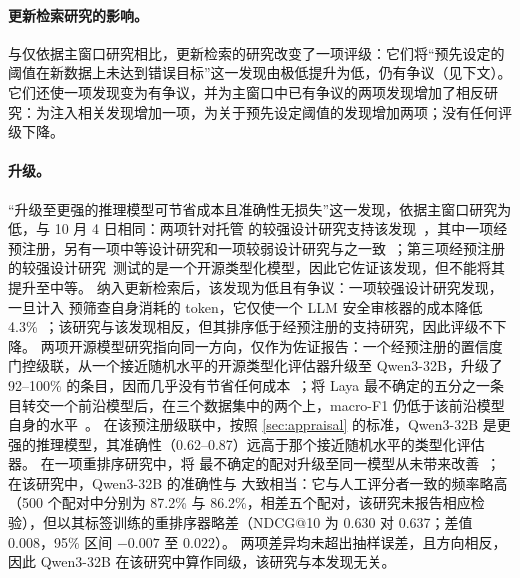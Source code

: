 \paragraph{更新检索研究的影响。}
与仅依据主窗口研究相比，更新检索的研究改变了一项评级：它们将“预先设定的阈值在新数据上未达到错误目标”这一发现由极低提升为低，仍有争议（见下文）。它们还使一项发现变为有争议，并为主窗口中已有争议的两项发现增加了相反研究：为注入相关发现增加一项，为关于预先设定阈值的发现增加两项；没有任何评级下降。

\paragraph{升级。}
“升级至更强的推理模型可节省成本且准确性无损失”这一发现，依据主窗口研究为低，与 10 月 4 日相同：两项针对托管 \jev{} 的较强设计研究支持该发现~\cite{arx26550,arx24574}，其中一项经预注册，另有一项中等设计研究和一项较弱设计研究与之一致~\cite{arx26532,arx02046}；第三项经预注册的较强设计研究~\cite{zen22922769}\zmark{}测试的是一个开源类型化模型，因此它佐证该发现，但不能将其提升至中等。
纳入更新检索后，该发现为低且有争议：一项较强设计研究发现，一旦计入 \jev{} 预筛查自身消耗的 token，它仅使一个 LLM 安全审核器的成本降低 4.3\%~\cite{arx02267}；该研究与该发现相反，但其排序低于经预注册的支持研究，因此评级不下降。
两项开源模型研究指向同一方向，仅作为佐证报告：一个经预注册的置信度门控级联，从一个接近随机水平的开源类型化评估器升级至 Qwen3-32B，升级了 92--100\% 的条目，因而几乎没有节省任何成本~\cite{arx07177}；将 Laya 最不确定的五分之一条目转交一个前沿模型后，在三个数据集中的两个上，macro-F1 仍低于该前沿模型自身的水平~\cite{arx03324}。
在该预注册级联中，按照 \cref{sec:appraisal} 的标准，Qwen3-32B 是更强的推理模型，其准确性（0.62--0.87）远高于那个接近随机水平的类型化评估器。
在一项重排序研究中，将 \jev{} 最不确定的配对升级至同一模型从未带来改善~\cite{arx09188}；在该研究中，Qwen3-32B 的准确性与 \jev{} 大致相当：它与人工评分者一致的频率略高（500 个配对中分别为 87.2\% 与 86.2\%，相差五个配对，该研究未报告相应检验），但以其标签训练的重排序器略差（NDCG@10 为 0.630 对 0.637；差值 0.008，95\% 区间 $-0.007$ 至 $0.022$）。
两项差异均未超出抽样误差，且方向相反，因此 Qwen3-32B 在该研究中算作同级，该研究与本发现无关。

